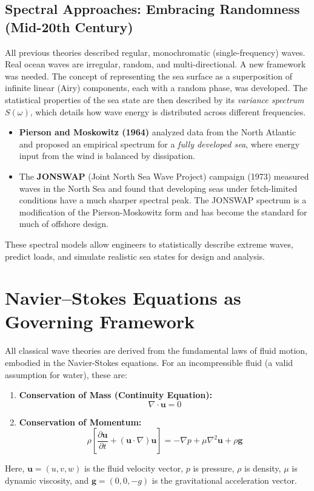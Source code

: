 \documentclass[11pt,letterpaper]{article}
\begin{document}
    \subsection{Spectral Approaches: Embracing Randomness (Mid-20th Century)}
    All previous theories described regular, monochromatic (single-frequency) waves. Real ocean waves are irregular, random, and multi-directional. A new framework was needed. The concept of representing the sea surface as a superposition of infinite linear (Airy) components, each with a random phase, was developed. The statistical properties of the sea state are then described by its \emph{variance spectrum} $S(\omega)$, which details how wave energy is distributed across different frequencies.
    \begin{itemize}
        \item \textbf{Pierson and Moskowitz (1964)} analyzed data from the North Atlantic and proposed an empirical spectrum for a \emph{fully developed sea}, where energy input from the wind is balanced by dissipation.
        \item The \textbf{JONSWAP} (Joint North Sea Wave Project) campaign (1973) measured waves in the North Sea and found that developing seas under fetch-limited conditions have a much sharper spectral peak. The JONSWAP spectrum is a modification of the Pierson-Moskowitz form and has become the standard for much of offshore design.
    \end{itemize}
    These spectral models allow engineers to statistically describe extreme waves, predict loads, and simulate realistic sea states for design and analysis.

    \section{Navier–Stokes Equations as Governing Framework}
    All classical wave theories are derived from the fundamental laws of fluid motion, embodied in the Navier-Stokes equations. For an incompressible fluid (a valid assumption for water), these are:
    \begin{enumerate}
        \item \textbf{Conservation of Mass (Continuity Equation):}
        \begin{equation}
            \nabla \cdot \mathbf{u} = 0
            \label{eq:continuity}
        \end{equation}
        \item \textbf{Conservation of Momentum:}
        \begin{equation}
            \rho \left[ \frac{\partial \mathbf{u}}{\partial t} + (\mathbf{u} \cdot \nabla) \mathbf{u} \right] = -\nabla p + \mu \nabla^2 \mathbf{u} + \rho \mathbf{g}
            \label{eq:navierstokes}
        \end{equation}
    \end{enumerate}
    Here, $\mathbf{u} = (u, v, w)$ is the fluid velocity vector, $p$ is pressure, $\rho$ is density, $\mu$ is dynamic viscosity, and $\mathbf{g} = (0, 0, -g)$ is the gravitational acceleration vector.
\end{document}
